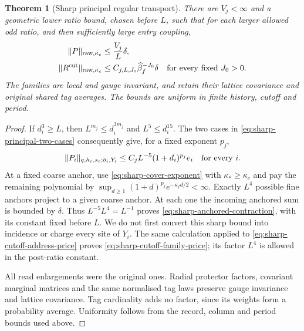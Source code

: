 \documentclass[11pt,reqno]{amsart}
\numberwithin{equation}{section}
\newtheorem{theorem}{Theorem}[section]
\theoremstyle{definition}
\theoremstyle{remark}
\begin{document}
\begin{theorem}[Sharp principal regular transport]
\label{thm:sharp-principal-transport}
There are \(V_j<\infty\) and a geometric lower ratio bound,
chosen before \(L\), such that for each larger allowed odd
ratio, and then sufficiently large entry coupling,
\begin{align}
 \|P\|_{\mathrm{raw},\kappa_c}&\le\frac{V_j}{L}\delta,
 \label{eq:sharp-anchored-contraction}\\
 \|R^{\rm cut}\|_{\mathrm{raw},\kappa_c}
                &\le C_{j,L,J_0}\widehat\beta_f^{-J_0}\delta
                         \quad\hbox{for every fixed }J_0>0.
 \label{eq:sharp-cutoff-family-price}
\end{align}
The families are local and gauge invariant, and retain
their lattice covariance and original shared tag averages.
The bounds are uniform in finite history, cutoff and period.
\end{theorem}
\begin{proof}
If \(d_i^3\ge L\), then \(L^{m_j}\le d_i^{3m_j}\) and
\(L^5\le d_i^{15}\). The two cases in
\eqref{eq:sharp-principal-two-cases} consequently give,
for a fixed exponent \(p_j\),
\[
 \|P_i\|_{q,h_c,s_c;\bar o_i,Y_i}
                      \le C_jL^{-5}(1+d_i)^{p_j}e_i
                                      \quad\hbox{for every }i.
\]
At a fixed coarse anchor, use
\eqref{eq:sharp-cover-exponent} with \(\kappa_*\ge\kappa_c\)
and pay the remaining polynomial by
\(\sup_{d\ge1}(1+d)^{p_j}e^{-\kappa_fd/2}<\infty\).
Exactly \(L^4\) possible fine anchors project to a given
coarse anchor. At each one the incoming anchored sum is
bounded by \(\delta\). Thus \(L^{-5}L^4=L^{-1}\) proves
\eqref{eq:sharp-anchored-contraction}, with its constant
fixed before \(L\). We do not first convert this sharp
bound into incidence or charge every site of \(Y_i\).
The same calculation applied to
\eqref{eq:sharp-cutoff-address-price} proves
\eqref{eq:sharp-cutoff-family-price}; its factor \(L^4\)
is allowed in the post-ratio constant.

All read enlargements were the original ones. Radial
protector factors, covariant marginal matrices and the
same normalised tag laws preserve gauge invariance and
lattice covariance. Tag cardinality adds no factor,
since its weights form a probability average. Uniformity
follows from the record, column and period bounds used
above.
\end{proof}
\end{document}
